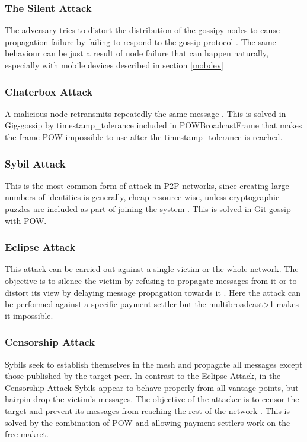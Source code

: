 \documentclass{article}
\begin{document}
\subsubsection{The Silent Attack}
The adversary tries to distort the distribution of the gossipy nodes to cause propagation failure by failing to respond to the gossip protocol \cite{AdHocNet}. The same behaviour can be just a result of node failure that can happen naturally, especially with mobile devices described in section \ref{mobdev} 

\subsubsection{Chaterbox Attack}
A malicious node retransmits repeatedly the same message \cite{AdHocNet}. This is solved in Gig-gossip by timestamp\_tolerance included in POWBroadcastFrame that makes the frame POW impossible to use after the timestamp\_tolerance is reached.

\subsubsection{Sybil Attack}
This is the most common form of attack in P2P networks, since creating large numbers of identities is generally, cheap resource-wise, unless cryptographic puzzles are included as part of joining the system \cite{GossipSub}. This is solved in Git-gossip with POW.

\subsubsection{Eclipse Attack}
This attack can be carried out against a single victim or the whole network. The objective is to
silence the victim by refusing to propagate messages from it or to distort its view by delaying message propagation towards it \cite{GossipSub}.
Here the attack can be performed against a specific payment settler but the multibroadcast>1 makes it impossible.

\subsubsection{Censorship Attack}
Sybils seek to establish themselves in the mesh and propagate all messages except those published by the target peer. In contrast to the Eclipse Attack, in the Censorship Attack Sybils appear to behave properly from all vantage points, but hairpin-drop the victim's messages. The objective of the attacker is to censor the target and prevent its messages from reaching the rest of the network \cite{GossipSub}. This is solved by the combination of POW and allowing payment settlers work on the free makret.
\end{document}
